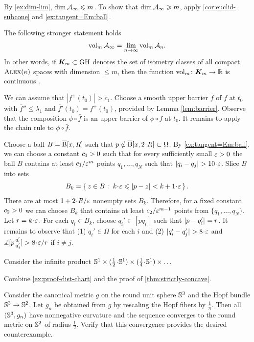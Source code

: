 By \ref{ex:dim-lim}, $\operatorname{\rm dim}\nolimits\mathcal{A}_\infty\leqslant m$.
To show that $\operatorname{\rm dim}\nolimits\mathcal{A}_\infty\geqslant m$,
apply \ref{cor:euclid-subcone} and \ref{ex:tangent=Em:ball}.

The following stronger statement holds
\[\operatorname{\rm vol}\nolimits_m\mathcal{A}_\infty=\lim_{n\to\infty} \operatorname{\rm vol}\nolimits_m\mathcal{A}_n.\]
In other words, if $\bm{K}_m\subset \operatorname{\rm GH}\nolimits$ denotes the set of isometry classes of all compact $\textup{\textsc{Alex}}(\kappa)$ spaces with dimension $\le m$, then the function $\operatorname{\rm vol}\nolimits_m\colon\bm{K}_m\to \mathbb{R}$ is continuous \cite[10.8]{burago-gromov-perelman}.

We can assume that $|f^+(t_0)|>c_1$.
Choose a smooth upper barrier $\bar f$ of $f$ at $t_0$ with $\bar f''\le \lambda_1$ and $\bar f'(t_0)=f^+(t_0)$, provided by Lemma \ref{lem:barrier}.
Observe that the composition $\phi\circ\bar f$ is an upper barrier of $\phi\circ f$ at $t_0$.
It remains to apply the chain rule to $\phi\circ\bar f$.

Choose a ball $B=\overline{\mathrm{B}}{}[x,R]$ such that $p\notin\cBall[x,2\cdot R]\subset \Omega$.
By \ref{ex:tangent=Em:ball}, we can choose a constant $c_1>0$ such that for every sufficiently small $\varepsilon>0$ the ball $B$ contains at least $c_1/{\varepsilon^m}$ points $q_1,\dots,q_N$ such that $\dist{q_i}{q_j}{}>10\cdot\eps$.
Slice $B$ into sets
\[B_k=\set{z\in B}{k\cdot \eps\le \dist{p}{z}{}< {k+1}\cdot \eps}.\]
There are at most $1+2\cdot R/\eps$ nonempty sets $B_k$.
Therefore, for a fixed constant $c_2>0$ we can choose $B_k$ that contains at least $c_2/\varepsilon^{m-1}$ points from $\{q_1,\dots,q_N\}$.
Let $r=k\cdot \eps$.
For each $q_i\in B_k$, choose $q_i'\in [pq_i]$ such that $\dist{p}{q_i'}{}=r$.
It remains to observe that (1) $q_i'\in\Omega$ for each $i$ and (2) $\dist{q_i'}{q_j'}{}>8\cdot\eps$ and $\mangle\hinge p{q_i'}{q_j'}>8\cdot \eps/r$ if $i\ne j$.

Consider the infinite product $\SSS^1\times ({\tfrac 12}\cdot \SSS^1)\times ({\tfrac 14}\cdot \SSS^1)\times\dots$

 Combine \ref{ex:proof-dist-chart} and the proof of \ref{thm:strictly-concave}.

Consider the canonical metric $g$ on the round unit sphere $\mathbb{S}^3$ and the Hopf bundle $\mathbb{S}^3\to \mathbb{S}^2$.
Let $g_n$ be obtained from $g$ by rescaling the Hopf fibers by $\frac{1}{n}$.
Then all $(\mathbb{S}^3,g_n)$ have nonnegative curvature and the sequence converges to the round metric on $\mathbb{S}^2$ of radius $\frac{1}{2}$.
Verify that this convergence provides the desired counterexample.

